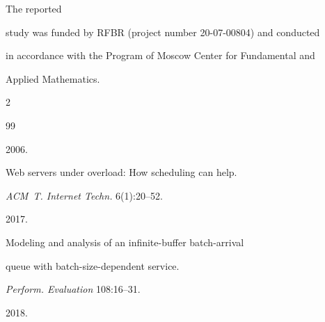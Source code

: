\noindent


The reported 


study was funded by RFBR (project number 20-07-00804) and conducted


in accordance with the Program of Moscow Center for Fundamental and 


Applied Mathematics.













 \begin{multicols}{2}





\renewcommand{\bibname}{\protect\rmfamily References}







{\small\frenchspacing


 {%




 \begin{thebibliography}{99}







 2006. 


Web servers under overload: How scheduling can help.


\textit{ACM~T. Internet Techn.} 6(1):20--52.







 2017.


Modeling and analysis of an infinite-buffer batch-arrival


queue with batch-size-dependent service.


\textit{Perform. Evaluation} 108:16--31.







 2018.



\end{thebibliography}}}
\end{multicols}
